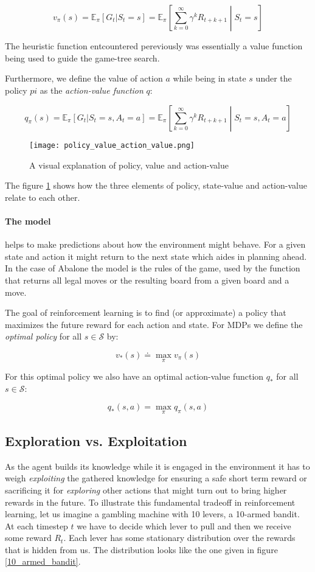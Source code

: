$$ v_{\pi}(s) = \mathbb{E}_{\pi}[G_t | S_t = s] = \mathbb{E}_{\pi}\left[\sum_{k=0}^{\infty} \gamma^kR_{t+k+1} \middle| S_t = s \right] $$

The heuristic function entcountered pereviously was essentially a value function being used to guide the game-tree search.

Furthermore, we define the value of action $a$ while being in state $s$ under the policy $pi$ as the \textit{action-value function} $q$:

$$ q_{\pi}(s) = \mathbb{E}_{\pi}[G_t | S_t = s, A_t = a] = \mathbb{E}_{\pi}\left[\sum_{k=0}^{\infty} \gamma^kR_{t+k+1} \middle| S_t = s, A_t = a \right] $$

\begin{figure}
    \centering
    \texttt{[image: policy\_value\_action\_value.png]}
    \caption{A visual explanation of policy, value and action-value \cite[p.62]{sutton_reinforcement_2018}}
    \label{policy_value_action_value}
\end{figure}

The figure \ref{policy_value_action_value} shows how the three elements of policy, state-value and action-value relate to each other.

\paragraph{The model} helps to make predictions about how the environment might behave. For a given state and action it might return to the next state which aides in planning ahead. In the case of Abalone the model is the rules of the game, used by the function that returns all legal moves or the resulting board from a given board and a move.

The goal of reinforcement learning is to find (or approximate) a policy that maximizes the future reward for each action and state. For MDPs we define the \textit{optimal policy} for all $ s \in \mathcal{S} $ by:

$$ v_{*}(s) \doteq \max_{\pi} v_{\pi}(s) $$

For this optimal policy we also have an optimal action-value function $ q_{*} $ for all $ s \in \mathcal{S}$:

$$ q_{*}(s, a) = \max_{\pi}q_{\pi}(s, a) $$

\subsection{Exploration vs. Exploitation}
\label{exploration_vs_exploitation}
As the agent builds its knowledge while it is engaged in the environment it has to weigh \textit{exploiting} the gathered knowledge for ensuring a safe short term reward or sacrificing it for \textit{exploring} other actions that might turn out to bring higher rewards in the future. To illustrate this fundamental tradeoff in reinforcement learning, let us imagine a gambling machine with 10 levers, a 10-armed bandit. At each timestep $ t $ we have to decide which lever to pull and then we receive some reward $ R_t $. Each lever has some stationary distribution over the rewards that is hidden from us. The distribution looks like the one given in figure \ref{10_armed_bandit}.

